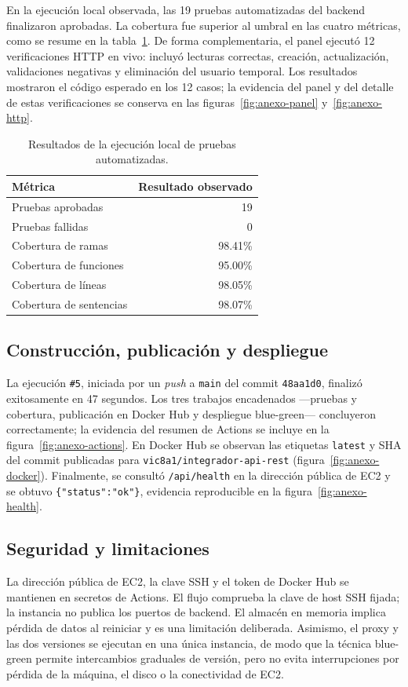 \documentclass[12pt,letterpaper]{article}
\begin{document}
En la ejecución local observada, las 19 pruebas automatizadas del backend finalizaron aprobadas. La cobertura fue superior al umbral en las cuatro métricas, como se resume en la tabla~\ref{tab:pruebas}. De forma complementaria, el panel ejecutó 12 verificaciones HTTP en vivo: incluyó lecturas correctas, creación, actualización, validaciones negativas y eliminación del usuario temporal. Los resultados mostraron el código esperado en los 12 casos; la evidencia del panel y del detalle de estas verificaciones se conserva en las figuras~\ref{fig:anexo-panel} y~\ref{fig:anexo-http}.

\begin{table}[H]
\centering
\caption{Resultados de la ejecución local de pruebas automatizadas.}
\label{tab:pruebas}
\begin{tabular}{>{\RaggedRight\arraybackslash}p{7cm}r}
\toprule
\textbf{Métrica} & \textbf{Resultado observado}\\
\midrule
Pruebas aprobadas & 19\\
Pruebas fallidas & 0\\
Cobertura de ramas & 98.41\%\\
Cobertura de funciones & 95.00\%\\
Cobertura de líneas & 98.05\%\\
Cobertura de sentencias & 98.07\%\\
\bottomrule
\end{tabular}
\end{table}

\subsection{Construcción, publicación y despliegue}
La ejecución \texttt{\#5}, iniciada por un \textit{push} a \texttt{main} del commit \texttt{48aa1d0}, finalizó exitosamente en 47 segundos. Los tres trabajos encadenados —pruebas y cobertura, publicación en Docker Hub y despliegue blue-green— concluyeron correctamente; la evidencia del resumen de Actions se incluye en la figura~\ref{fig:anexo-actions}. En Docker Hub se observan las etiquetas \texttt{latest} y SHA del commit publicadas para \texttt{vic8a1/integrador-api-rest} (figura~\ref{fig:anexo-docker}). Finalmente, se consultó \texttt{/api/health} en la dirección pública de EC2 y se obtuvo \texttt{\{"status":"ok"\}}, evidencia reproducible en la figura~\ref{fig:anexo-health}.

\subsection{Seguridad y limitaciones}
La dirección pública de EC2, la clave SSH y el token de Docker Hub se mantienen en secretos de Actions. El flujo comprueba la clave de host SSH fijada; la instancia no publica los puertos de backend. El almacén en memoria implica pérdida de datos al reiniciar y es una limitación deliberada. Asimismo, el proxy y las dos versiones se ejecutan en una única instancia, de modo que la técnica blue-green permite intercambios graduales de versión, pero no evita interrupciones por pérdida de la máquina, el disco o la conectividad de EC2.
\end{document}
